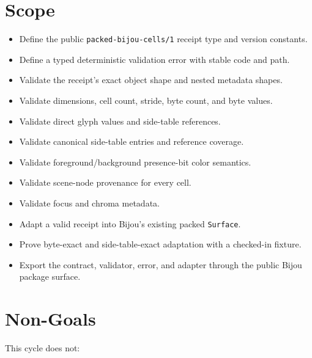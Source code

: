 \section{Scope}\label{record-164-scope}

\begin{itemize}
\tightlist
\item
  Define the public \texttt{p\allowbreak{}a\allowbreak{}c\allowbreak{}k\allowbreak{}e\allowbreak{}d\allowbreak{}-\allowbreak{}b\allowbreak{}i\allowbreak{}j\allowbreak{}o\allowbreak{}u\allowbreak{}-\allowbreak{}c\allowbreak{}e\allowbreak{}l\allowbreak{}l\allowbreak{}s\allowbreak{}/\allowbreak{}1} receipt type and version constants.
\item
  Define a typed deterministic validation error with stable code and path.
\item
  Validate the receipt's exact object shape and nested metadata shapes.
\item
  Validate dimensions, cell count, stride, byte count, and byte values.
\item
  Validate direct glyph values and side-table references.
\item
  Validate canonical side-table entries and reference coverage.
\item
  Validate foreground/background presence-bit color semantics.
\item
  Validate scene-node provenance for every cell.
\item
  Validate focus and chroma metadata.
\item
  Adapt a valid receipt into Bijou's existing packed \texttt{S\allowbreak{}u\allowbreak{}r\allowbreak{}f\allowbreak{}a\allowbreak{}c\allowbreak{}e}.
\item
  Prove byte-exact and side-table-exact adaptation with a checked-in fixture.
\item
  Export the contract, validator, error, and adapter through the public Bijou package surface.
\end{itemize}

\section{Non-Goals}\label{record-164-non-goals}

This cycle does not:


